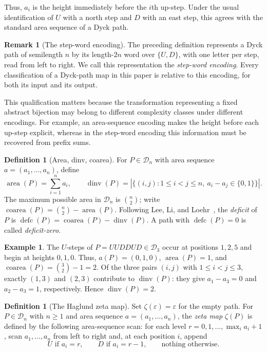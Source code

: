 \documentclass[11pt]{article}
\theoremstyle{definition}
\newtheorem{definition}[theorem]{Definition}
\newtheorem{example}[theorem]{Example}
\newtheorem{remark}[theorem]{Remark}
\newcommand{\D}{\mathcal D}
\newcommand{\area}{\operatorname{area}}
\newcommand{\dinv}{\operatorname{dinv}}
\newcommand{\coarea}{\operatorname{coarea}}
\newcommand{\defc}{\operatorname{defc}}
\begin{document}
Thus, $a_i$ is the height immediately before the $i$th up-step.  Under the
usual identification of $U$ with a north step and $D$ with an east step,
this agrees with the standard area sequence of a Dyck path.

\begin{remark}[The step-word encoding]\label{rmk:step-word}
The preceding definition represents a Dyck path of semilength $n$ by its
length-$2n$ word over $\{U,D\}$, with one letter per step, read from left to
right.  We call this representation the \emph{step-word encoding}.  Every
classification of a Dyck-path map in this paper is relative to this encoding,
for both its input and its output.

This qualification matters because the transformation representing a fixed
abstract bijection may belong to different complexity classes under different
encodings.  For example, an area-sequence encoding makes the height before
each up-step explicit, whereas in the step-word encoding this information must
be recovered from prefix sums.
\end{remark}

\begin{definition}[Area, dinv, coarea]
For $P\in\D_n$ with area sequence $a=(a_1,\ldots,a_n)$, define
\[
   \area(P)=\sum_{i=1}^n a_i,\qquad
   \dinv(P)=|\{(i,j):1\le i<j\le n,\ a_i-a_j\in\{0,1\}\}|.
\]
The maximum possible area in $\D_n$ is $\binom n2$; write
$\coarea(P)=\binom n2-\area(P)$.  Following Lee, Li, and
Loehr~\cite[Definition~1.4]{LeeLiLoehr2018}, the \emph{deficit} of $P$ is
$\defc(P)=\coarea(P)-\dinv(P)$.
A path with $\defc(P)=0$ is called \emph{deficit-zero}.
\end{definition}

\begin{example}
The $U$-steps of $P=UUDDUD\in\D_3$ occur at positions $1,2,5$ and begin at
heights $0,1,0$.  Thus, $a(P)=(0,1,0)$, $\area(P)=1$, and
$\coarea(P)=\binom32-1=2$.
Of the three pairs $(i,j)$ with $1\le i<j\le3$, exactly $(1,3)$ and
$(2,3)$ contribute to $\dinv(P)$: they give
$a_1-a_3=0$ and $a_2-a_3=1$, respectively.  Hence $\dinv(P)=2$.
\end{example}

\begin{definition}[The Haglund zeta map]\label{def:zeta}
Set $\zeta(\varepsilon)=\varepsilon$ for the empty path.  For
$P\in\D_n$ with $n\ge 1$ and area sequence $a=(a_1,\ldots,a_n)$, the
\emph{zeta map} $\zeta(P)$ is defined by the following area-sequence scan: for
each level $r=0,1,\ldots,\max_i a_i+1$, scan $a_1,\ldots,a_n$ from left to
right and, at each position $i$, append
\[
   U\text{ if }a_i=r,\qquad D\text{ if }a_i=r-1,\qquad
   \text{nothing otherwise.}
\]
\end{definition}
\end{document}
